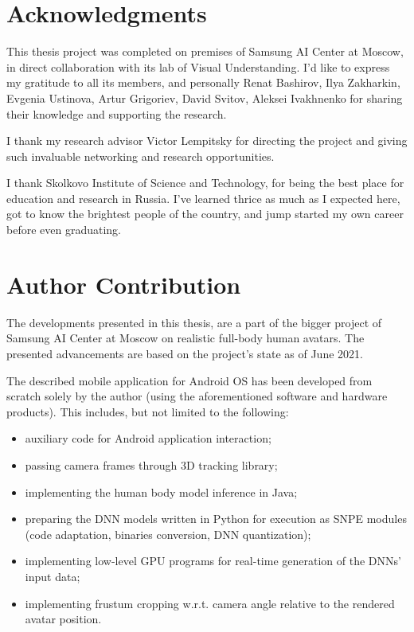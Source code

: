 \section*{\centering Acknowledgments}
This thesis project was completed on premises of Samsung AI Center at Moscow, in direct collaboration with its lab of Visual Understanding. I'd like to express my gratitude to all its members, and personally Renat Bashirov, Ilya Zakharkin, Evgenia Ustinova, Artur Grigoriev, David Svitov, Aleksei Ivakhnenko for sharing their knowledge and supporting the research.

I thank my research advisor Victor Lempitsky for directing the project and giving such invaluable networking and research opportunities.

I thank Skolkovo Institute of Science and Technology, for being the best place for education and research in Russia. I've learned thrice as much as I expected here, got to know the brightest people of the country, and jump started my own career before even graduating.

\section*{\centering Author Contribution}

The developments presented in this thesis, are a part of the bigger project of Samsung AI Center at Moscow on realistic full-body human avatars. The presented advancements are based on the project's state as of June 2021. 

The described mobile application for Android OS has been developed from scratch solely by the author (using the aforementioned software and hardware products). This includes, but not limited to the following:
\begin{itemize}
	\item auxiliary code for Android application interaction;
	\item passing camera frames through 3D tracking library;
	\item implementing the human body model \cite{dnn:smplx19} inference in Java;
	\item preparing the DNN models written in Python for execution as SNPE modules (code adaptation, binaries conversion, DNN quantization);
	\item implementing low-level GPU programs for real-time generation of the DNNs' input data;
	\item implementing frustum cropping w.r.t. camera angle relative to the rendered avatar position.
\end{itemize}

